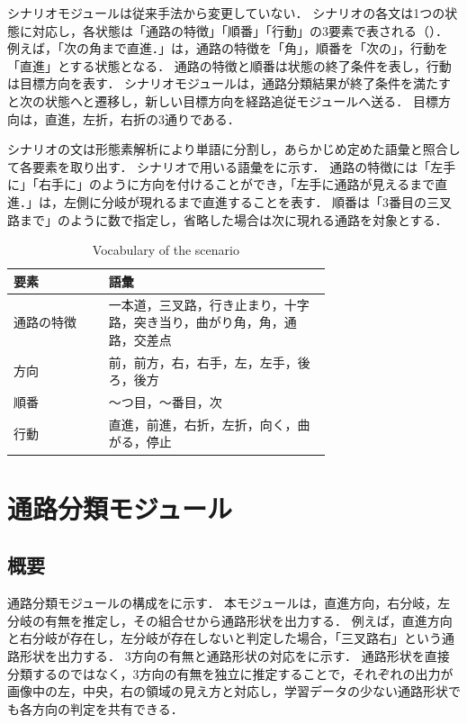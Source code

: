 シナリオモジュールは従来手法\cite{scenario_si2023}から変更していない．
シナリオの各文は1つの状態に対応し，各状態は「通路の特徴」「順番」「行動」の3要素で表される（）．
例えば，「次の角まで直進．」は，通路の特徴を「角」，順番を「次の」，行動を「直進」とする状態となる．
通路の特徴と順番は状態の終了条件を表し，行動は目標方向を表す．
シナリオモジュールは，通路分類結果が終了条件を満たすと次の状態へと遷移し，新しい目標方向を経路追従モジュールへ送る．
目標方向は，直進，左折，右折の3通りである．

シナリオの文は形態素解析により単語に分割し，あらかじめ定めた語彙と照合して各要素を取り出す．
シナリオで用いる語彙をに示す．
通路の特徴には「左手に」「右手に」のように方向を付けることができ，「左手に通路が見えるまで直進．」は，左側に分岐が現れるまで直進することを表す．
順番は「3番目の三叉路まで」のように数で指定し，省略した場合は次に現れる通路を対象とする．

\begin{table}[tb]
  \centering
  \caption{Vocabulary of the scenario}
  \label{tab:scenario_vocabulary}
  \begin{tabular}{lp{0.7\linewidth}}
    \toprule
    要素 & 語彙 \\
    \midrule
    通路の特徴 & 一本道，三叉路，行き止まり，十字路，突き当り，曲がり角，角，通路，交差点 \\
    方向 & 前，前方，右，右手，左，左手，後ろ，後方 \\
    順番 & 〜つ目，〜番目，次 \\
    行動 & 直進，前進，右折，左折，向く，曲がる，停止 \\
    \bottomrule
  \end{tabular}
\end{table}


\section{通路分類モジュール}
\label{sec:corridor_classifier}

\subsection{概要}

通路分類モジュールの構成をに示す．
本モジュールは，直進方向，右分岐，左分岐の有無を推定し，その組合せから通路形状を出力する．
例えば，直進方向と右分岐が存在し，左分岐が存在しないと判定した場合，「三叉路右」という通路形状を出力する．
3方向の有無と通路形状の対応をに示す．
通路形状を直接分類するのではなく，3方向の有無を独立に推定することで，それぞれの出力が画像中の左，中央，右の領域の見え方と対応し，学習データの少ない通路形状でも各方向の判定を共有できる．

